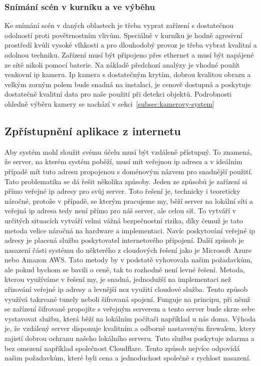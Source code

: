 \subsubsection{Snímání scén v kurníku a ve výběhu}
Ke snímání scén v daných oblastech je třeba vyprat zařízení s dostatečnou odolností proti povětrnostním vlivům.
Speciálně v kurníku je hodně agresivní prostředí kvůli vysoké vlhkosti a pro dlouhodobý provoz je třeba vybrat kvalitní a odolnou techniku.
Zařízení musí být připojeno přes ethernet a musí být napájené ze sítě nikoli pomocí baterie.
Na základě předchozí analýzy je vhodné použít venkovní ip kameru.
Ip kamera s dostatečným krytím, dobrou kvalitou obrazu a velkým zorným polem bude snadná na instalaci, je cenově dostupná a poskytuje dostatečně kvalitní data pro naše použití při detekci objektů.
Podrobnosti ohledně výběru kamery se nachází v sekci~\ref{subsec:kamerovy-system}

\subsection{Zpřístupnění aplikace z internetu}\label{subsec:zpristupneni-aplikace-z-internetu}
Aby systém mohl sloužit svému účelu musí být vzdáleně přístupný.
To znamená, že server, na kterém systém poběží, musí mít veřejnou ip adresu a v ideálním případě mít tuto adresu propojenou s doménovým názvem pro snadnější použití.
Tato problematika se dá řešit několika způsoby.
\newline
Jeden ze způsobů je zařízení si přímo veřejné ip adresy pro svůj server.
Toto řešení je, technicky i teoreticky náročné, protože v případě, se kterým pracujeme my, běží server na lokální síti a veřejná ip adresa tedy není přímo pro náš server, ale celou síť.
To vytváří v určitých situacích vytváří velmi vážná bezpečnostní rizika, díky čemuž je tato metoda velice náročná na hardware a implementaci.
Navíc poskytování veřejné ip adresy je placená služba poskytovatel internetového připojení.
\newline
Další způsob je nasazení části systému do některého z cloudových řešení jako je Microsoft Azure nebo Amazon AWS.
Tato metody by v podstatě vyhovovala našim požadavkům, ale pokud bychom se bavili o ceně, tak to rozhodně není levné řešení.
\newline
Metoda, kterou využíváme v řešení my, je snadná, jednodužší na implementaci než zřizování veřejné ip adresy a levnější nez využití cloudové služba.
Tento způsob využívá takzvané tunely neboli šifrovaná spojení.
Funguje na principu, při němž se zařízení šifrovaně propojíte s veřejným serverem a tento server bude skrze sebe vystavovat službu, která běží na lokálním počítači například u nás doma.
Výhoda je, že vzdálený server disponuje kvalitním a odborně nastaveným firewalem, ktery zajistí dobrou ochranu našeho lokálního serveru.
Tuto službu poskytuje zdarma a bez omezení například společnost Cloudflare.
Tento způsob nejvíce odpovídá našim požadavkům, které byli cena a jednoduchost společně s rychlost nasazení.

